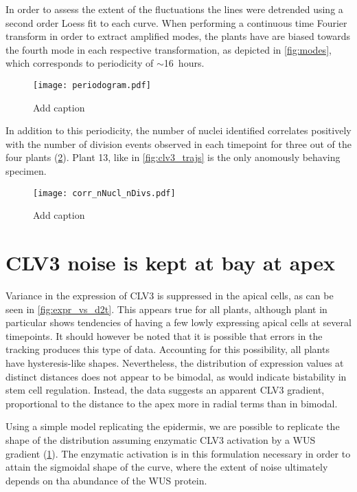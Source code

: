 In order to assess the extent of the fluctuations the lines were detrended using
a second order Loess fit to each curve. When performing a continuous time
Fourier transform in order to extract amplified modes, the plants have are
biased towards the fourth mode in each respective transformation, as depicted in
\cref{fig:modes}, which corresponds to periodicity of $\sim$16~hours. 

\begin{figure}[H]
  \centering
  \texttt{[image: periodogram.pdf]}
  \caption{Add caption}
  \label{fig:periodogram}
\end{figure}


In addition to this periodicity, the number of nuclei identified correlates
positively with the number of division events observed in each timepoint for
three out of the four plants (\cref{fig:corr_nNucl_nDivs}). Plant 13, like in 
\cref{fig:clv3_trajs} is the only anomously behaving specimen.

\begin{figure}[H]
  \centering
  \texttt{[image: corr\_nNucl\_nDivs.pdf]}
  \caption{Add caption}
  \label{fig:corr_nNucl_nDivs}
\end{figure}

\section{CLV3 noise is kept at bay at apex}

Variance in the expression of CLV3 is suppressed in the apical cells, as can be
seen in \cref{fig:expr_vs_d2t}. This appears true for all plants, although plant
in particular shows tendencies of having a few lowly expressing apical cells at
several timepoints. It should however be noted that it is possible that errors
in the tracking produces this type of data. Accounting for this possibility, all
plants have hysteresis-like shapes. Nevertheless, the distribution of expression
values at distinct distances does not appear to be bimodal, as would indicate
bistability in stem cell regulation. Instead, the data suggests an apparent CLV3
gradient, proportional to the distance to the apex more in radial terms than
in bimodal. 

Using a simple model replicating the epidermis, we are possible to replicate the
shape of the distribution assuming enzymatic CLV3 activation by a WUS gradient
(\cref{}). The enzymatic activation is in this formulation necessary in order to
attain the sigmoidal shape of the curve, where the extent of noise ultimately
depends on tha abundance of the WUS protein.
\FIG

